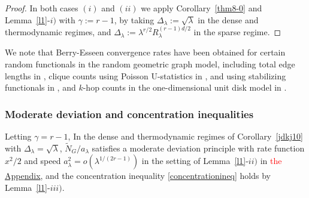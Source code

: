 \documentclass[bj,authoryear,noshowframe]{imsart}
\theoremstyle{plain}
\theoremstyle{remark}
\newtheorem{remark}[prop]{Remark}
\begin{document}
\begin{proof}
  In both cases $(i)$ and $(ii)$ we apply Corollary~\ref{thm8-0} 
  and Lemma~\ref{l1}-$i)$ with $\gamma :=r-1$,
  by taking 
  $\Delta_\lambda:=
  \sqrt{\lambda}$
  in the dense and  thermodynamic regimes,
  and 
  $\Delta_\lambda:= \lambda^{r/2} R_\lambda^{(r-1)d/2}$
  in the sparse regime.
\end{proof} 
We note that Berry-Esseen convergence rates have been obtained
for certain random functionals in the random geometric graph
model, including total edge lengths in \cite[Corollary~4.3]{schulte},
clique counts using Poisson U-statistics in \cite[Theorem~4.1]{reitzner}, and using stabilizing functionals in \cite[Theorem~3.15]{lachiezerey4},
and $k$-hop counts in the one-dimensional unit disk model in
\cite[Proposition~8.1]{privaultkhops}. 



\subsubsection*{Moderate deviation and concentration inequalities} 
\noindent 
Letting $\gamma =r-1$, 
In the dense and thermodynamic regimes of 
Corollary~\ref{jdkj10} with $\Delta_\lambda=
\sqrt{\lambda}$, $\widetilde{N}_G/a_\lambda$
    satisfies a moderate deviation principle
with rate function $x^2/2$
and speed $a_\lambda^2 = o( \lambda^{1/(2r - 1)} )$
in the setting of Lemma~\ref{l1}-$ii)$ in \textcolor{red}{the} \hyperref[appn]{Appendix},
and the concentration inequality 
\eqref{concentrationineq} holds by Lemma~\ref{l1}-$iii)$. 
\end{document}
